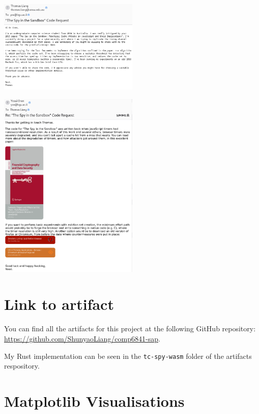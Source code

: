 \documentclass[a4paper,10pt,twocolumn]{article}
\theoremstyle{definition}
\newcommand*{\code}{\texttt}
\begin{document}
\begin{center}
  \includegraphics[width=0.5\textwidth]{email-to-oren.png}
\end{center}

\begin{center}
  \includegraphics[width=0.5\textwidth]{reply-from-oren.png}
\end{center}

\section{Link to artifact}

You can find all the artifacts for this project at the following GitHub
repository: \url{https://github.com/ShunyaoLiang/comp6841-sap}.

My Rust implementation can be seen in the \code{tc-spy-wasm} folder of the
artifacts respository.

\section{Matplotlib Visualisations}
\end{document}
